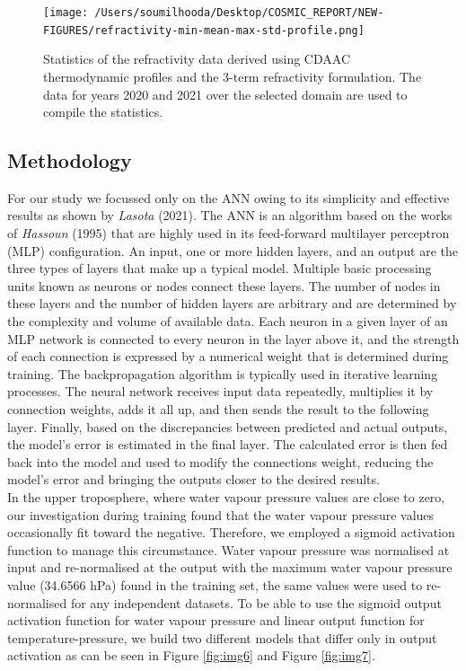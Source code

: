\documentclass[a4paper,12pt,twoside]{article}
\begin{document}
\begin{figure}[H]
		\centering
		\texttt{[image: /Users/soumilhooda/Desktop/COSMIC\_REPORT/NEW-FIGURES/refractivity-min-mean-max-std-profile.png]}
		\caption{Statistics of the refractivity data derived using CDAAC thermodynamic profiles and the 3-term refractivity formulation. The data for years 2020 and 2021 over the selected domain are used to compile the statistics.}
		\label{fig:img8}
\end{figure}




\subsection{Methodology}

\noindent For our study we focussed only on the ANN owing to its simplicity and effective results as shown by \textit{Lasota} (2021). The ANN is an algorithm based on the works of \textit{Hassoun} (1995) that are highly used in its feed-forward multilayer perceptron (MLP) configuration. An input, one or more hidden layers, and an output are the three types of layers that make up a typical model. Multiple basic processing units known as neurons or nodes connect these layers. The number of nodes in these layers and the number of hidden layers are arbitrary and are determined by the complexity and volume of available data. Each neuron in a given layer of an MLP network is connected to every neuron in the layer above it, and the strength of each connection is expressed by a numerical weight that is determined during training. The backpropagation algorithm is typically used in iterative learning processes. The neural network receives input data repeatedly, multiplies it by connection weights, adds it all up, and then sends the result to the following layer. Finally, based on the discrepancies between predicted and actual outputs, the model's error is estimated in the final layer. The calculated error is then fed back into the model and used to modify the connections weight, reducing the model's error and bringing the outputs closer to the desired results.\\

\noindent In the upper troposphere, where water vapour pressure values are close to zero, our investigation during training found that the water vapour pressure values occasionally fit toward the negative. Therefore, we employed a sigmoid activation function to manage this circumstance. Water vapour pressure was normalised at input and re-normalised at the output with the maximum water vapour pressure value (34.6566 hPa) found in the training set, the same values were used to re-normalised for any independent datasets. To be able to use the sigmoid output activation function for water vapour pressure and linear output function for temperature-pressure, we build two different models that differ only in output activation as can be seen in Figure \ref{fig:img6} and Figure \ref{fig:img7}. 
\end{document}
